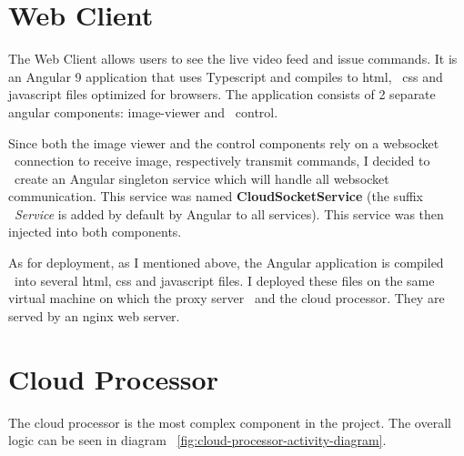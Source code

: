 \section{Web Client}
\label{sec:implementation-web-client}
The Web Client allows users to see the live video feed and issue commands.
It is an Angular 9 application that uses Typescript and compiles to html, \
css and javascript files optimized for browsers.
The application consists of 2 separate angular components: image-viewer and \
control.


Since both the image viewer and the control components rely on a websocket \
connection to receive image, respectively transmit commands, I decided to \
create an Angular singleton service which will handle all websocket communication.
This service was named \textbf{CloudSocketService} (the suffix \
\textit{Service} is added by default by Angular to all services).
This service was then injected into both components.

As for deployment, as I mentioned above, the Angular application is compiled \
into several html, css and javascript files.
I deployed these files on the same virtual machine on which the proxy server \
and the cloud processor.
They are served by an nginx web server.







\section{Cloud Processor}
\label{sec:implementation-cloud-processor}
The cloud processor is the most complex component in the project.
The overall logic can be seen in diagram ~\ref{fig:cloud-processor-activity-diagram}.

